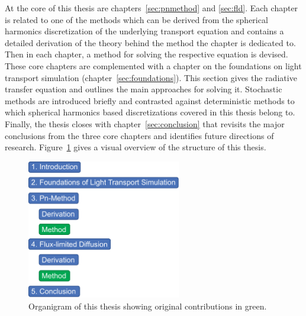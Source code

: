 At the core of this thesis are chapters~\ref{sec:pnmethod} and \ref{sec:fld}. Each chapter is related to one of the methods which can be derived from the spherical harmonics discretization of the underlying transport equation and contains a detailed derivation of the theory behind the method the chapter is dedicated to. Then in each chapter, a method for solving the respective equation is devised. These core chapters are complemented with a chapter on the foundations on light transport simulation (chapter~\ref{sec:foundations}). This section gives the radiative transfer equation and outlines the main approaches for solving it. Stochastic methods are introduced briefly and contrasted against deterministic methods to which spherical harmonics based discretizations covered in this thesis belong to. Finally, the thesis closes with chapter~\ref{sec:conclusion} that revisits the major conclusions from the three core chapters and identifies future directions of research. Figure~\ref{fig:intro_organization} gives a visual overview of the structure of this thesis.
\begin{figure}[ht]
\hspace{0.1\columnwidth}
\includegraphics[width=0.6\textwidth]{02_Introduction/figures/fig_organigram.pdf}
\caption{Organigram of this thesis showing original contributions in green.}
\label{fig:intro_organization}
\end{figure}









